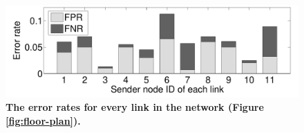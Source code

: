 
\begin{figure}[t]
	\centering
	\includegraphics[width=1.0\linewidth]{9-Testbed-12nodes}
	\vspace{-0.7cm}
	\caption{\textbf{The error rates for every link in the network (Figure \ref{fig:floor-plan}).}}
	\label{fig:EVA-11nodes}
	\vspace{-0.55cm}
\end{figure}






